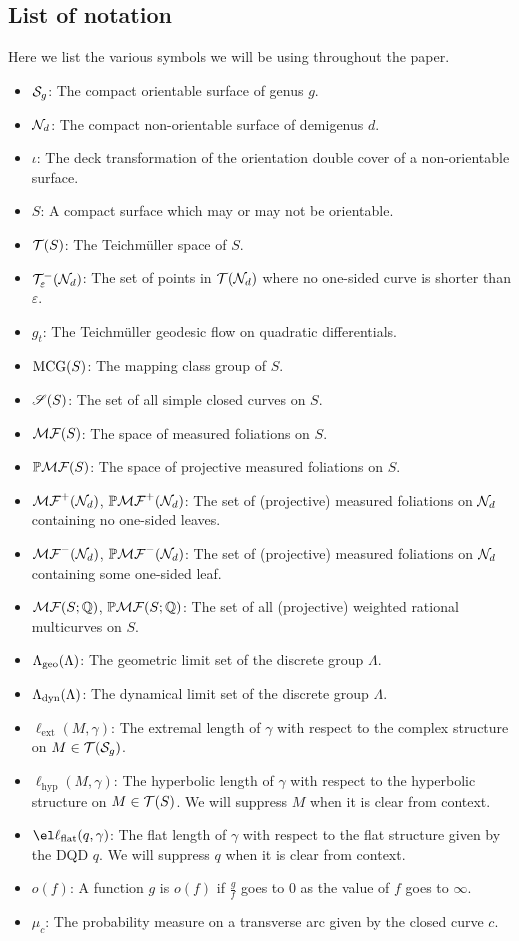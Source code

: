 \documentclass[12pt, reqno]{amsart}
\begin{document}
\subsection*{List of notation}
Here we list the various symbols we will be using throughout the paper.
\begin{itemize}
\item[] $\mathcal{S}_g$: The compact orientable surface of genus $g$.
\item[] $\mathcal{N}_{d}$: The compact non-orientable surface of demigenus $d$.
\item[] $\iota$: The deck transformation of the orientation double cover of a non-orientable surface.
\item[] $S$: A compact surface which may or may not be orientable.
\item[] $\mathcal{T}(S)$: The Teichm\"uller space of $S$.
\item[] $\mathcal{T}_{\varepsilon}^{-}(\mathcal{N}_d)$: The set of points in $\mathcal{T}(\mathcal{N}_d)$ where no one-sided curve is shorter than
  $\varepsilon$.
\item[] $g_t$: The Teichm\"uller geodesic flow on quadratic differentials.
\item[] $\mathrm{MCG}(S)$: The mapping class group of $S$.
\item[] $\mathscr{S}(S)$: The set of all simple closed curves on $S$.
\item[] $\mathcal{MF}(S)$: The space of measured foliations on $S$.
\item[] $\mathbb{P}\mathcal{MF}(S)$: The space of projective measured foliations on $S$.
\item[] $\mathcal{MF}^+(\mathcal{N}_d)$, $\mathbb{P}\mathcal{MF}^+(\mathcal{N}_d)$: The set of (projective) measured foliations on $\mathcal{N}_d$ containing
  no one-sided leaves.
\item[] $\mathcal{MF}^-(\mathcal{N}_d)$, $\mathbb{P}\mathcal{MF}^-(\mathcal{N}_d)$: The set of (projective) measured foliations on $\mathcal{N}_d$ containing
  some one-sided leaf.
\item[] $\mathcal{MF}(S; \mathbb{Q})$, $\mathbb{P}\mathcal{MF}(S; \mathbb{Q})$: The set of all (projective) weighted rational multicurves on $S$.
\item[] $\Lambda_{\mathrm{geo}}(\Lambda)$: The geometric limit set of the discrete group $\Lambda$.
\item[] $\Lambda_{\mathrm{dyn}}(\Lambda)$: The dynamical limit set of the discrete group $\Lambda$.
\item[] $\ell_{\mathrm{ext}}(M, \gamma)$: The extremal length of $\gamma$ with respect to the complex structure on $M \in \mathcal{T}(\mathcal{S}_g)$.
\item[] $\ell_{\mathrm{hyp}}(M, \gamma)$: The hyperbolic length of $\gamma$ with respect to the hyperbolic structure on $M \in \mathcal{T}(S)$. We will suppress $M$ when it is clear from context.
\item[] $\el\lflat(q, \gamma)$: The flat length of $\gamma$ with respect to the flat structure given by the DQD $q$. We will suppress $q$ when it is clear from context.
\item[] $o(f)$: A function $g$ is $o(f)$ if $\frac{g}{f}$ goes to $0$ as the value of $f$ goes to $\infty$.
\item[] $\mu_{c}$: The probability measure on a transverse arc given by the closed curve $c$.
\end{itemize}
\end{document}
